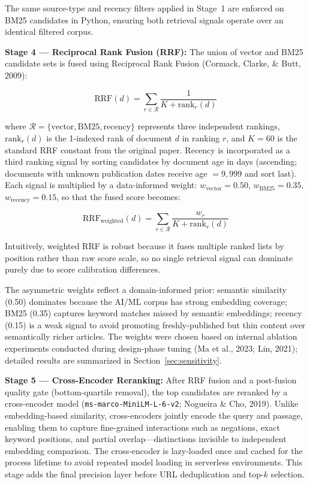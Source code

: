 The same source-type and recency filters applied in Stage~1 are enforced on BM25 candidates in Python, ensuring both retrieval signals operate over an identical filtered corpus.

\textbf{Stage 4 --- Reciprocal Rank Fusion (RRF):} The union of vector and BM25 candidate sets is fused using Reciprocal Rank Fusion (Cormack, Clarke, \& Butt, 2009):

\begin{equation}
  \text{RRF}(d) = \sum_{r \in \mathcal{R}} \frac{1}{K + \text{rank}_r(d)}
  \label{eq:rrf}
\end{equation}

\noindent where $\mathcal{R} = \{\text{vector}, \text{BM25}, \text{recency}\}$ represents three independent rankings, $\text{rank}_r(d)$ is the 1-indexed rank of document $d$ in ranking $r$, and $K = 60$ is the standard RRF constant from the original paper. Recency is incorporated as a third ranking signal by sorting candidates by document age in days (ascending; documents with unknown publication dates receive age $= 9{,}999$ and sort last). Each signal is multiplied by a data-informed weight: $w_{\text{vector}} = 0.50$, $w_{\text{BM25}} = 0.35$, $w_{\text{recency}} = 0.15$, so that the fused score becomes:

\begin{equation}
  \text{RRF}_{\text{weighted}}(d) = \sum_{r \in \mathcal{R}} \frac{w_r}{K + \text{rank}_r(d)}
  \label{eq:weighted_rrf}
\end{equation}

Intuitively, weighted RRF is robust because it fuses multiple ranked lists by position rather than raw score scale, so no single retrieval signal can dominate purely due to score calibration differences.

The asymmetric weights reflect a domain-informed prior: semantic similarity (0.50) dominates because the AI/ML corpus has strong embedding coverage; BM25 (0.35) captures keyword matches missed by semantic embeddings; recency (0.15) is a weak signal to avoid promoting freshly-published but thin content over semantically richer articles. The weights were chosen based on internal ablation experiments conducted during design-phase tuning (Ma et al., 2023; Lin, 2021); detailed results are summarized in Section~\ref{sec:sensitivity}.

\textbf{Stage 5 --- Cross-Encoder Reranking:} After RRF fusion and a post-fusion quality gate (bottom-quartile removal), the top candidates are reranked by a cross-encoder model (\texttt{ms-marco-MiniLM-L-6-v2}; Nogueira \& Cho, 2019). Unlike embedding-based similarity, cross-encoders jointly encode the query and passage, enabling them to capture fine-grained interactions such as negations, exact keyword positions, and partial overlap---distinctions invisible to independent embedding comparison. The cross-encoder is lazy-loaded once and cached for the process lifetime to avoid repeated model loading in serverless environments. This stage adds the final precision layer before URL deduplication and top-$k$ selection.

